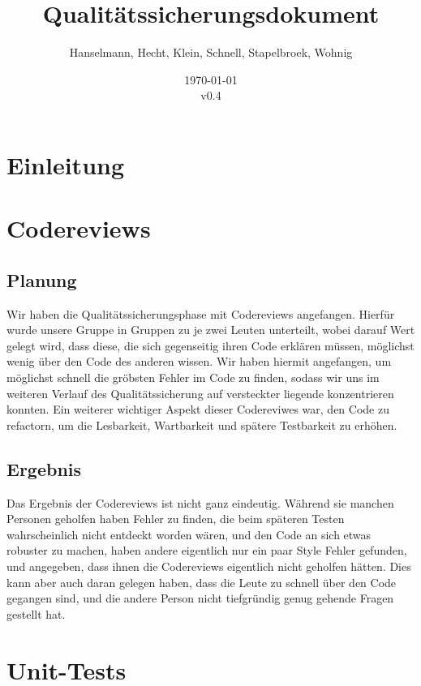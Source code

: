 ﻿\documentclass[a4paper]{scrreprt}
\begin{document}
\title{Qualitätssicherungsdokument}
\author{Hanselmann, Hecht, Klein, Schnell, Stapelbroek, Wohnig}
\date{\today\\v0.4}
\maketitle 
\tableofcontents	

\chapter{Einleitung}


\chapter{Codereviews}

\section{Planung}
Wir haben die Qualitätssicherungsphase mit Codereviews angefangen.
Hierfür wurde unsere Gruppe in Gruppen zu je zwei Leuten unterteilt, wobei
darauf Wert gelegt wird, dass diese, die sich gegenseitig ihren Code erklären
müssen, möglichst wenig über den Code des anderen wissen. Wir haben hiermit
angefangen, um möglichst schnell die gröbsten Fehler im Code zu finden, sodass
wir uns im weiteren Verlauf des Qualitätssicherung auf versteckter liegende konzentrieren
konnten. Ein weiterer wichtiger Aspekt dieser Codereviwes war, den Code zu
refactorn, um die Lesbarkeit, Wartbarkeit und spätere Testbarkeit zu erhöhen.

\section{Ergebnis}
Das Ergebnis der Codereviews ist nicht ganz eindeutig. Während sie manchen
Personen geholfen haben Fehler zu finden, die beim späteren Testen
wahrscheinlich nicht entdeckt worden wären, und den Code an sich etwas robuster
zu machen, haben andere eigentlich nur ein paar Style Fehler gefunden, und
angegeben, dass ihnen die Codereviews eigentlich nicht geholfen hätten. Dies
kann aber auch daran gelegen haben, dass die Leute zu schnell über den Code
gegangen sind, und die andere Person nicht tiefgründig genug gehende Fragen
gestellt hat.

\chapter{Unit-Tests}
\end{document}
